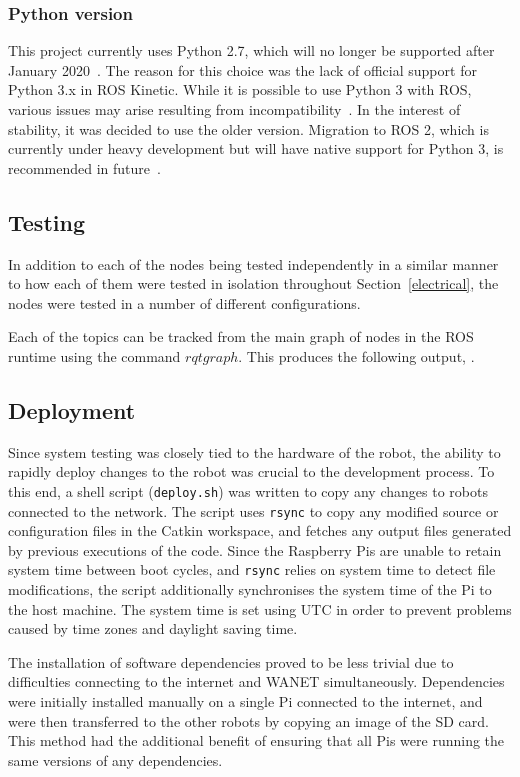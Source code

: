 \subsubsection{Python version}
This project currently uses Python 2.7, which will no longer be supported
after January 2020~\cite{python2-eol}. The reason for this choice was the
lack of official support for Python 3.x in ROS Kinetic. While it is
possible to use Python 3 with ROS, various issues may arise resulting from
incompatibility~\cite{medium-ros-python3}. In the interest of stability,
it was decided to use the older version. Migration to ROS 2, which is
currently under heavy development but will have native support for Python
3, is recommended in future~\cite{ros2}.

\subsection{Testing}\label{soft/ROS/test}
In addition to each of the nodes being tested independently in a similar
manner to how each of them were tested in isolation throughout
Section~\ref{electrical}, the nodes were tested in a number of different
configurations.

Each of the topics can be tracked from the main graph of nodes in the ROS
runtime using the command $rqt graph$. This produces the following output,
.


\subsection{Deployment}\label{soft/ROS/deploy}
Since system testing was closely tied to the hardware of the robot, the
ability to rapidly deploy changes to the robot was crucial to the
development process. To this end, a shell script (\verb|deploy.sh|) was
written to copy any changes to robots connected to the network. The script
uses \verb|rsync| to copy any modified source or configuration files in
the Catkin workspace, and fetches any output files generated by previous
executions of the code. Since the Raspberry Pis are unable to retain
system time between boot cycles, and \verb|rsync| relies on system time to
detect file modifications, the script additionally synchronises the system time
of the Pi to the host machine. The system time is set using UTC in order
to prevent problems caused by time zones and daylight saving time.

The installation of software dependencies proved to be less trivial due to
difficulties connecting to the internet and WANET simultaneously.
Dependencies were initially installed manually on a single Pi connected to
the internet, and were then transferred to the other robots by copying an
image of the SD card. This method had the additional benefit of ensuring
that all Pis were running the same versions of any dependencies.

